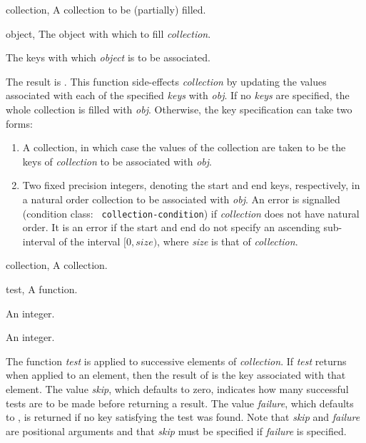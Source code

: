 \begin{optDefinition}
%
\begin{genericargs}
    \item[collection, \classref{collection}] A collection to be (partially)
    filled.
    \item[object, \classref{object}] The object with which to fill {\em
        collection}.
    \item[\optional{keys}] The keys with which {\em object\/} is to be
    associated.
\end{genericargs}
%
\result%
The result is \nil{}.
%
\remarks%
This function side-effects {\em collection\/} by updating the values
associated with each of the specified {\em keys\/} with {\em obj}.  If
no {\em keys\/} are specified, the whole collection is filled with
{\em obj}.  Otherwise, the key specification can take two forms:
%
\begin{enumerate}
    \item A collection, in which case the values of the collection are taken to
    be the keys of {\em collection\/} to be associated with {\em obj}.
    \item Two fixed precision integers, denoting the start and end keys,
    respectively, in a natural order collection to be associated with {\em obj}.
    An error is signalled (condition class: {\tt
        collection-condition}) if {\em
        collection\/} does not have natural order.  It is an error if the start
    and end do not specify an ascending sub-interval of the interval $[0,size)$,
    where {\em size\/} is that of {\em collection}.
\end{enumerate}

%
\begin{genericargs}
    \item[collection, \classref{collection}] A collection.
    \item[test, \classref{function}] A function.
    \item[\optional{skip}] An integer.
    \item[\optional{failure}] An integer.
\end{genericargs}
%
\result%
The function {\em test\/} is applied to successive elements of {\em
    collection}. If {\em test\/} returns \true{} when applied to an element,
then the result of  is the key associated with that
element.
%
\remarks%
The value {\em skip\/}, which defaults to zero, indicates how many successful
tests are to be made before returning a result. The value {\em failure}, which
defaults to \nil{}, is returned if no key satisfying the test was found. Note
that {\em skip\/} and {\em failure\/} are positional arguments and that {\em
    skip\/} must be specified if {\em failure\/} is specified.


\end{optDefinition}
